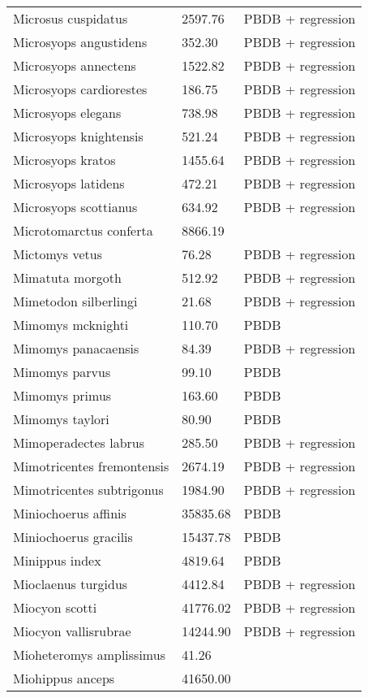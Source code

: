 \begin{center}
\begin{longtable}{p{} p{} p{} }
  Microsus cuspidatus & 2597.76 & PBDB + regression \\ 
  Microsyops angustidens & 352.30 & PBDB + regression \\ 
  Microsyops annectens & 1522.82 & PBDB + regression \\ 
  Microsyops cardiorestes & 186.75 & PBDB + regression \\ 
  Microsyops elegans & 738.98 & PBDB + regression \\ 
  Microsyops knightensis & 521.24 & PBDB + regression \\ 
  Microsyops kratos & 1455.64 & PBDB + regression \\ 
  Microsyops latidens & 472.21 & PBDB + regression \\ 
  Microsyops scottianus & 634.92 & PBDB + regression \\ 
  Microtomarctus conferta & 8866.19 & \cite{Tomiya2013} \\ 
  Mictomys vetus & 76.28 & PBDB + regression \\ 
  Mimatuta morgoth & 512.92 & PBDB + regression \\ 
  Mimetodon silberlingi & 21.68 & PBDB + regression \\ 
  Mimomys mcknighti & 110.70 & PBDB \\ 
  Mimomys panacaensis & 84.39 & PBDB + regression \\ 
  Mimomys parvus & 99.10 & PBDB \\ 
  Mimomys primus & 163.60 & PBDB \\ 
  Mimomys taylori & 80.90 & PBDB \\ 
  Mimoperadectes labrus & 285.50 & PBDB + regression \\ 
  Mimotricentes fremontensis & 2674.19 & PBDB + regression \\ 
  Mimotricentes subtrigonus & 1984.90 & PBDB + regression \\ 
  Miniochoerus affinis & 35835.68 & PBDB \\ 
  Miniochoerus gracilis & 15437.78 & PBDB \\ 
  Minippus index & 4819.64 & PBDB \\ 
  Mioclaenus turgidus & 4412.84 & PBDB + regression \\ 
  Miocyon scotti & 41776.02 & PBDB + regression \\ 
  Miocyon vallisrubrae & 14244.90 & PBDB + regression \\ 
  Mioheteromys amplissimus & 41.26 & \cite{Tomiya2013} \\ 
  Miohippus anceps & 41650.00 & \cite{McKenna2011} \\ 

\end{longtable}
\end{center}
